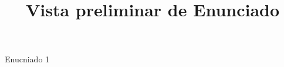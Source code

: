 \documentclass[a4paper,10pt]{article}\usepackage[utf8]{inputenc}\usepackage[spanish]{babel}\usepackage{arial}
\title{Vista preliminar de Enunciado}
\begin{document}
\twocolumn 

\maketitle

Enucniado 1
\end{document}
